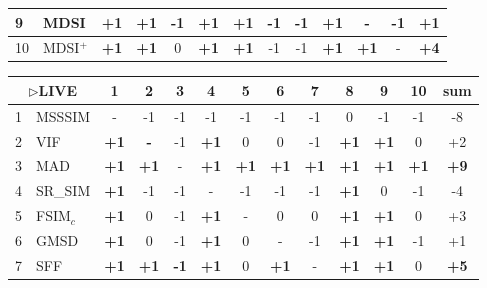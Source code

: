 \begin{table*}[htb]
{\begin{tabular}{|l|l|c|c|c|c|c|c|c|c|c|c||c|}
9         & MDSI           & \textbf{+1} & \textbf{+1} & -1          & \textbf{+1} & \textbf{+1} & -1          & -1 & \textbf{+1} & -           & -1          & +1          \\ \hline
10        & MDSI$^+$          & \textbf{+1} & \textbf{+1} & 0           & \textbf{+1} & \textbf{+1} & -1          & -1 & \textbf{+1} & \textbf{+1} & -           & \textbf{+4} \\ \hline
\end{tabular}
\newline
\vspace*{2 mm}
\newline
\begin{tabular}{|l|l|c|c|c|c|c|c|c|c|c|c||c|}
\hline
\multicolumn{2}{|c|}{$\rhd$LIVE} & 1           & 2           & 3           & 4           & 5           & 6           & 7           & 8           & 9           & 10          & sum         \\ \hline
1         & MSSSIM         & -           & -1          & -1          & -1          & -1          & -1          & -1          & 0           & -1          & -1          & -8          \\ \hline
2         & VIF            & \textbf{+1} & \textbf{-}  & -1          & \textbf{+1} & 0           & 0           & -1          & \textbf{+1} & \textbf{+1} & 0           & +2          \\ \hline
3         & MAD            & \textbf{+1} & \textbf{+1} & -           & \textbf{+1} & \textbf{+1} & \textbf{+1} & \textbf{+1} & \textbf{+1} & \textbf{+1} & \textbf{+1} & \textbf{+9} \\ \hline
4         & SR\_SIM        & \textbf{+1} & -1          & -1          & -           & -1          & -1          & -1          & \textbf{+1} & 0           & -1          & -4          \\ \hline
5         & FSIM$_c$          & \textbf{+1} & 0           & -1          & \textbf{+1} & -           & 0           & 0           & \textbf{+1} & \textbf{+1} & 0           & +3          \\ \hline
6         & GMSD           & \textbf{+1} & 0           & -1          & \textbf{+1} & 0           & -           & -1          & \textbf{+1} & \textbf{+1} & -1          & +1          \\ \hline
7         & SFF            & \textbf{+1} & \textbf{+1} & \textbf{-1} & \textbf{+1} & 0           & \textbf{+1} & -           & \textbf{+1} & \textbf{+1} & 0           & \textbf{+5} \\ \hline

\end{tabular}}
\end{table*}
